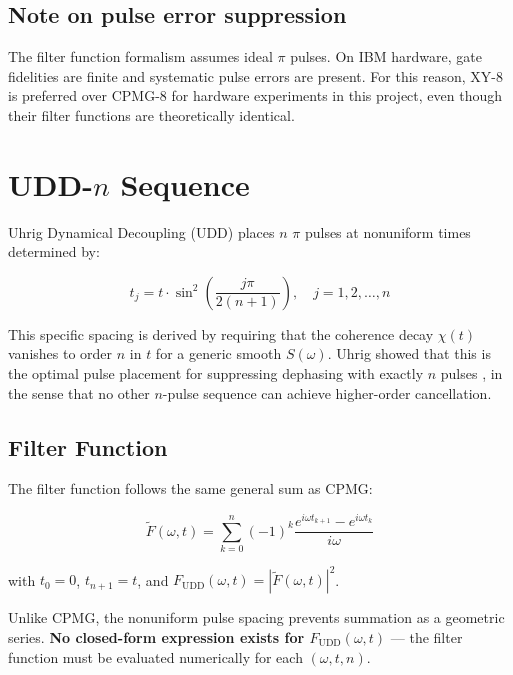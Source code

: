 \documentclass[12pt]{article}
\begin{document}
\subsection*{Note on pulse error suppression}

The filter function formalism assumes ideal $\pi$ pulses. On IBM hardware, gate fidelities are finite and systematic pulse errors are present. For this reason, XY-8 is preferred over CPMG-8 for hardware experiments in this project, even though their filter functions are theoretically identical.

\section{UDD-\texorpdfstring{$n$}{n} Sequence}

Uhrig Dynamical Decoupling (UDD) \cite{Uhrig2007} places $n$ $\pi$ pulses at nonuniform times determined by:

\begin{equation}
    t_j = t \cdot \sin^2\!\left(\frac{j\pi}{2(n+1)}\right), \quad j = 1, 2, \ldots, n
\end{equation}

This specific spacing is derived by requiring that the coherence decay $\chi(t)$ vanishes to order $n$ in $t$ for a generic smooth $S(\omega)$. Uhrig showed that this is the optimal pulse placement for suppressing dephasing with exactly $n$ pulses \cite{Uhrig2007}, in the sense that no other $n$-pulse sequence can achieve higher-order cancellation.

\subsection*{Filter Function}

The filter function follows the same general sum as CPMG:

\begin{equation}
    \tilde{F}(\omega, t) = \sum_{k=0}^{n} (-1)^k \frac{e^{i\omega t_{k+1}} - e^{i\omega t_k}}{i\omega}
\end{equation}

with $t_0 = 0$, $t_{n+1} = t$, and $F_\text{UDD}(\omega, t) = |\tilde{F}(\omega, t)|^2$.

Unlike CPMG, the nonuniform pulse spacing prevents summation as a geometric series. \textbf{No closed-form expression exists for $F_\text{UDD}(\omega, t)$} — the filter function must be evaluated numerically for each $(\omega, t, n)$.
\end{document}
